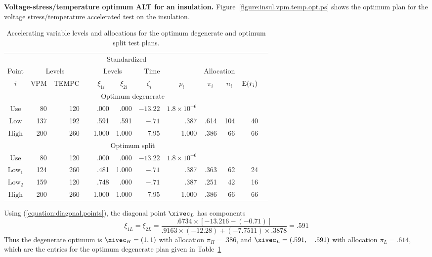\begin{example}
{\bf Voltage-stress/temperature optimum ALT for an insulation.} 
\label{example:tvalt.insulation.volt.temp.opt.plan}
Figure~\ref{figure:insul.vpm.temp.opt.ps} shows the optimum plan for
the voltage stress/temperature accelerated test on the insulation.
\begin{table}
\caption{Accelerating variable levels and
allocations for the optimum degenerate
and optimum split test plans.}
\centering\small
\begin{tabular}{c*{11}{r}}
&&&&\multicolumn{3}{c}{Standardized}
 \\
\cline{5-7}
Point&\multicolumn{2}{c}{Levels}& &
\multicolumn{2}{c}{Levels} & Time& &\multicolumn{2}{c}{Allocation} \\
\cline{2-3} \cline{5-6} \cline{9-10}
\multicolumn{1}{c}{$i$} &
\multicolumn{1}{c}{VPM} &
\multicolumn{1}{c}{TEMPC} & &
\multicolumn{1}{c}{$\xi_{1i}$} &
\multicolumn{1}{c}{$\xi_{2i}$} &
\multicolumn{1}{c}{$\zeta_{i}$} &
\multicolumn{1}{c}{$p_{i}$} &
\multicolumn{1}{c}{$\pi_{i}$}&
\multicolumn{1}{c}{$n_{i}$}&
\multicolumn{1}{c}{${\rm E}(r_{i})$} \\
\hline
\multicolumn{11}{c}{Optimum  degenerate}\\
  $\mbox{Use}$ &  80 & 120 & & .000     & .000     &$-13.22 $ 
	&$1.8\times 10^{-6}$\\
   $\mbox{Low}$  & 137 & 192 &&  .591 & .591  & $-.71$ & .387 & .614& 104& 
40\\
   $\mbox{High}$ & 200 & 260 && 1.000 & 1.000 & 7.95   & 1.000& .386& 66&  
66\\
\multicolumn{11}{c}{Optimum split}\\
  $\mbox{Use}$ &  80 & 120 & & .000     & .000     &$-13.22 $ 
	&$1.8\times 10^{-6}$\\
   $\mbox{Low}_{1}$ & 124 & 260 && .481 & 1.000 &$-.71$  & .387& .363 & 62&  
24\\
   $\mbox{Low}_{2}$ & 159 & 120 && .748 & .000 &  $-.71$  & .387&.251& 42& 
16\\
   $\mbox{High}$  & 200 & 260 &&  1.000 & 1.000 &   7.95  & 1.000 & .386& 66&  66  \\
 \hline
\end{tabular}
\begin{minipage}[t]{4in}
\end{minipage}
\label{table:tvalt.volt.temp.opt.details}
\end{table}
Using (\ref{equation:diagonal.points}),
the diagonal
point $\xivec_{L}$ has components
\begin{displaymath}
\xi_{1L}=\xi_{2L}=\frac{.6734 \times [-13.216-(-0.71)]
		       }
		       {
.9163\times (-12.28)+(-7.7511) \times .3878
		       }=.591
\end{displaymath}
Thus the degenerate optimum is $\xivec_{H}=(1,1)$ 
with allocation $\pi_{H}=.386$,
and $\xivec_{L}=(.591, \quad .591)$ with allocation $\pi_{L}=.614$, 
which are the entries for the optimum degenerate plan
given in Table~\ref{table:tvalt.volt.temp.opt.details}


\end{example}
